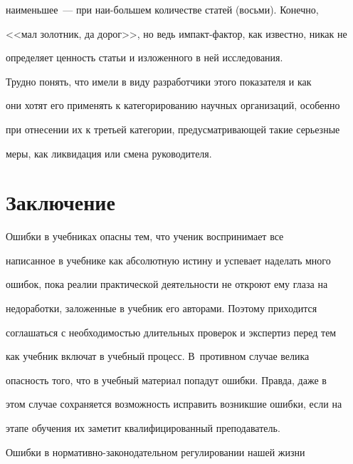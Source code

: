 наименьшее~--- при наи-\linebreak большем количестве статей (восьми). Конечно, 


<<мал золотник, да дорог>>, но ведь импакт-фактор, как известно, никак не 


определяет ценность статьи и изложенного в ней исследования.


{ %





}


    


    Трудно понять, что имели в виду разработчики этого показателя и как 


они хотят его применять к категорированию научных организаций, особенно 


при отнесении их к третьей категории, предусматривающей такие серьезные 


меры, как ликвидация или смена руководителя.





\section{Заключение}


    


    Ошибки в учебниках опасны тем, что ученик воспринимает все 


написанное в учебнике как абсолютную истину и успевает наделать много 


ошибок, пока реалии практической деятельности не откроют ему глаза на 


недоработки, заложенные в учебник его авторами. Поэтому приходится 


соглашаться с необходимостью длительных проверок и экспертиз перед тем 


как учебник включат в учебный процесс. В~противном случае велика 


опасность того, что в учебный материал попадут ошибки. Правда, даже в 


этом случае сохраняется возможность исправить возникшие ошибки, если на 


этапе обучения их заметит квалифицированный преподаватель.


    


    Ошибки в нормативно-законодательном регулировании нашей жизни 


